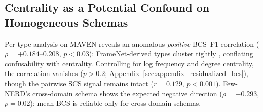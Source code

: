 \subsection{Centrality as a Potential Confound on Homogeneous Schemas}
\label{sec:centrality_confound}
Per-type analysis on MAVEN reveals an anomalous \emph{positive} BCS--F1 correlation ($\rho = +0.184\text{--}0.208$, $p < 0.03$): FrameNet-derived types cluster tightly \citep{cai-isotropy-clusters-2021}, conflating confusability with centrality. Controlling for log frequency and degree centrality, the correlation vanishes ($p > 0.2$; Appendix~\ref{sec:appendix_residualized_bcs}), though the pairwise SCS signal remains intact ($r = 0.129$, $p < 0.001$). Few-NERD's cross-domain schema shows the expected negative direction ($\rho = -0.293$, $p = 0.02$); mean BCS is reliable only for cross-domain schemas.

